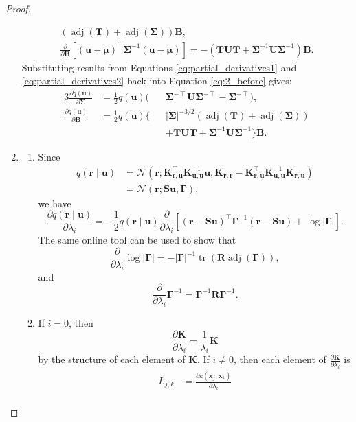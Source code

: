 \documentclass{mpaper}
\DeclareMathOperator{\adj}{adj}
\DeclareMathOperator{\tr}{tr}
\newcommand{\Kuu}{\mathbf{K}_{\mathbf{u},\mathbf{u}}}
\newcommand{\Krr}{\mathbf{K}_{\mathbf{r},\mathbf{r}}}
\newcommand{\Kru}{\mathbf{K}_{\mathbf{r},\mathbf{u}}}
\newcommand{\dB}{\frac{\partial}{\partial\mathbf{B}}}
\newcommand{\dl}{\frac{\partial}{\partial \lambda_i}}
\begin{document}
\begin{proof}
\begin{enumerate}
\begin{equation}
\begin{gathered}
        (\adj(\mathbf{T}) + \adj(\bm\Sigma))\mathbf{B}, \\
        \dB[(\mathbf{u} - \bm\mu)^\intercal\bm\Sigma^{-1}(\mathbf{u} -
        \bm\mu)] = -(\mathbf{TUT} +
        \bm\Sigma^{-1}\mathbf{U}\bm\Sigma^{-1})\mathbf{B}.
      \end{gathered}
    \end{equation}
    Substituting results from Equations \ref{eq:partial_derivatives1} and
    \ref{eq:partial_derivatives2} back into Equation \ref{eq:2_before} gives:
    \begin{alignat*}{3}
      \frac{\partial q(\mathbf{u})}{\partial \bm\Sigma} &=
      \frac{1}{2}q(\mathbf{u})(&&\bm\Sigma^{-\intercal}\mathbf{U}\bm\Sigma^{-\intercal}
      - \bm\Sigma^{-\intercal}), \\
      \frac{\partial q(\mathbf{u})}{\partial \mathbf{B}} &=
      \frac{1}{2}q(\mathbf{u}) \{&&|\bm\Sigma|^{-3/2}(\adj(\mathbf{T}) +
      \adj(\bm\Sigma)) \\
      & &&+ \mathbf{TUT} + \bm\Sigma^{-1}\mathbf{U}\bm\Sigma^{-1} \} \mathbf{B}.
    \end{alignat*}
  \item
    \begin{enumerate}
    \item Since
    \begin{align*}
      q(\mathbf{r} \mid \mathbf{u}) &= \mathcal{N}(\mathbf{r};
      \Kru^\intercal\Kuu^{-1}\mathbf{u}, \Krr - \Kru^\intercal \Kuu^{-1}\Kru) \\
      &= \mathcal{N}(\mathbf{r}; \mathbf{Su}, \bm\Gamma),
    \end{align*}
    we have
    \[
      \frac{\partial q(\mathbf{r} \mid \mathbf{u})}{\partial \lambda_i} =
      -\frac{1}{2}q(\mathbf{r} \mid \mathbf{u}) \dl[(\mathbf{r} -
      \mathbf{Su})^\intercal\bm\Gamma^{-1}(\mathbf{r} - \mathbf{Su}) +
      \log|\bm\Gamma|].
    \]
    The same online tool can be used to show that
    \[
      \dl \log|\bm\Gamma| = -|\bm\Gamma|^{-1}\tr(\mathbf{R}\adj(\bm\Gamma)),
    \]
    and
    \[
      \dl \bm\Gamma^{-1} = \bm\Gamma^{-1}\mathbf{R}\bm\Gamma^{-1}.
    \]
  \item
    If $i=0$, then
    \[
      \frac{\partial \mathbf{K}}{\partial \lambda_i} =
      \frac{1}{\lambda_i}\mathbf{K}
    \]
    by the structure of each element of $\mathbf{K}$. If $i \ne 0$, then each
    element of $\frac{\partial \mathbf{K}}{\partial \lambda_i}$ is
    \begin{align*}
      L_{j,k} &= \frac{\partial k(\mathbf{x}_j, \mathbf{x}_k)}{\partial \lambda_i} \\

\end{align*}
\end{enumerate}
\end{enumerate}
\end{proof}
\end{document}
